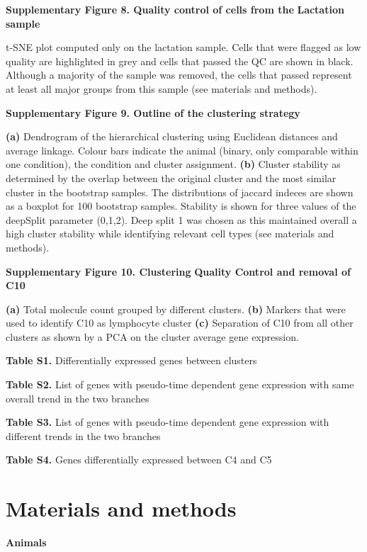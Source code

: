 \documentclass[titlepage, 12pt, oneside]{amsart}
\begin{document}
\textbf{Supplementary Figure 8. Quality control of cells from the}
\textbf{Lactation sample}

t-SNE plot computed only on the lactation sample.
Cells that were flagged as low quality are highlighted in grey and cells that passed the QC are shown in black.
Although a majority of the sample was removed, the cells that passed represent at least all major groups from this sample (see materials and methods).

\textbf{Supplementary Figure 9. Outline of the clustering strategy }

\textbf{(a)} Dendrogram of the hierarchical clustering using Euclidean distances and average linkage.
Colour bars indicate the animal (binary, only comparable within one condition), the condition and cluster assignment.
\textbf{(b)} Cluster stability as determined by the overlap between the original cluster and the most similar cluster in the bootstrap samples.
The distributions of jaccard indeces are shown as a boxplot for 100 bootstrap samples.
Stability is shown for three values of the deepSplit parameter (0,1,2).
Deep split 1 was chosen as this maintained overall a high cluster stability while identifying relevant cell types (see materials and methods).

\textbf{Supplementary Figure 10. Clustering} \textbf{Quality Control and
removal of C10}

\textbf{(a)} Total molecule count grouped by different clusters.
\textbf{(b)} Markers that were used to identify C10 as lymphocyte cluster\autocite{Scheele2017} \textbf{(c)} Separation of C10 from all other clusters as shown by a PCA on the cluster average gene expression.

\textbf{Table S1.} Differentially expressed genes between clusters

\textbf{Table S2.} List of genes with pseudo-time dependent gene
expression with same overall trend in the two branches

\textbf{Table S3.} List of genes with pseudo-time dependent gene
expression with different trends in the two branches

\textbf{Table S4.} Genes differentially expressed between C4 and C5

\section{Materials and methods}

\textbf{Animals}
\end{document}
